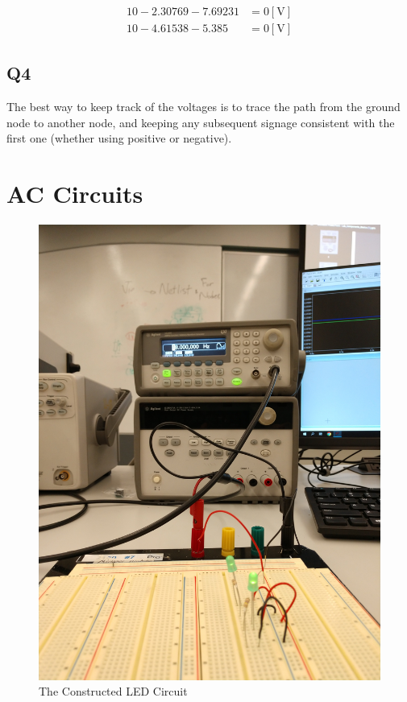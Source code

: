 \documentclass[
	letterpaper, %
	10pt, %
]{CSUniSchoolLabReport}
\begin{document}
\begin{equation}
  \begin{split}
    10 - 2.30769 - 7.69231 &= 0[\si{\volt}]\\ 
    10 - 4.61538 - 5.385 &= 0[\si{\volt}]
\end{split}
  \label{eq:2}
\end{equation}

\subsection{Q4} The best way to keep track of the voltages is to trace the path from the ground node to another node, and keeping any subsequent signage consistent with the first one (whether using positive or negative).

\section{AC Circuits}

\begin{figure}[h!]
  \centering
  \includegraphics[width=.9\textwidth, angle=270]{Figures/L3C1.jpg}
  \caption{The Constructed LED Circuit}
  \label{fig:1}
\end{figure}
\end{document}
